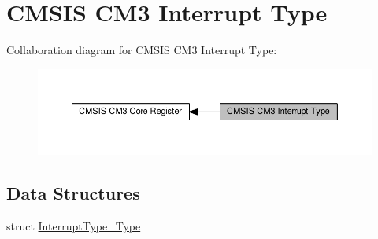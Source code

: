 \hypertarget{group__CMSIS__CM3__InterruptType}{}\section{C\+M\+S\+IS C\+M3 Interrupt Type}
\label{group__CMSIS__CM3__InterruptType}
Collaboration diagram for C\+M\+S\+IS C\+M3 Interrupt Type\+:\nopagebreak
\begin{figure}[H]
\begin{center}
\leavevmode
\includegraphics[width=350pt]{d2/d04/group__CMSIS__CM3__InterruptType}
\end{center}
\end{figure}
\subsection*{Data Structures}
\begin{DoxyCompactItemize}
\item 
struct \hyperlink{structInterruptType__Type}{Interrupt\+Type\+\_\+\+Type}
\end{DoxyCompactItemize}

